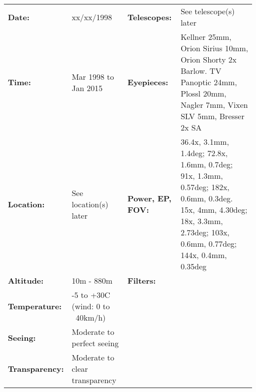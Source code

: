 \begin{tabular}{ p{0.9in} p{1.3in} p{1.2in} p{5.2in}}
{\bf Date:} & xx/xx/1998 & {\bf Telescopes:} & See telescope(s) later \\ 
{\bf Time:} & Mar 1998 to Jan 2015 & {\bf Eyepieces:} & Kellner 25mm, Orion Sirius 10mm, Orion Shorty 2x Barlow. TV Panoptic 24mm, Plossl 20mm, Nagler 7mm, Vixen SLV 5mm, Bresser 2x SA \\ 
{\bf Location:} & See location(s) later & {\bf Power, EP, FOV:} & 36.4x, 3.1mm, 1.4deg; 72.8x, 1.6mm, 0.7deg; 91x, 1.3mm, 0.57deg; 182x, 0.6mm, 0.3deg. 15x, 4mm, 4.30deg; 18x, 3.3mm, 2.73deg; 103x, 0.6mm, 0.77deg; 144x, 0.4mm, 0.35deg \\ 
{\bf Altitude:} & 10m - 880m & {\bf Filters:} &  \\ 
{\bf Temperature:} & -5 to +30C (wind: 0 to ~40km/h) & & \\ 
{\bf Seeing:} & Moderate to perfect seeing & & \\ 
{\bf Transparency:} & Moderate to clear transparency & & \\ 
\end{tabular}
